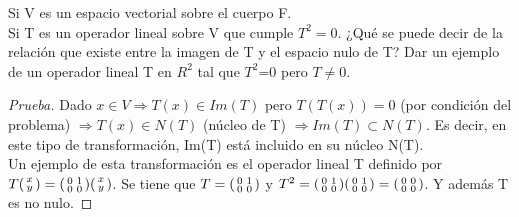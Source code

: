 \documentclass[12pt]{article}
\newenvironment{problem}[2][Problem]{\begin{trivlist}
\item[\hskip \labelsep {\bfseries #1}\hskip \labelsep {\bfseries #2.}]}{\end{trivlist}}
\newenvironment{xmat}
  {\left(\begin{smallmatrix}}
  {\end{smallmatrix}\right)}
\begin{document}
\begin{problem}{2}
\end{problem}
\begin{problem}{2.1}
Si V es un espacio vectorial sobre el cuerpo F. \\
Si T es un operador lineal sobre V que cumple $T^{2}=0$. ¿Qué se puede decir de la relación que existe entre la imagen de T y el espacio nulo de T? Dar un ejemplo de un operador lineal T en $R^{2}$ tal que $T^{2}$=0 pero $T\neq0$.
\end{problem}
 
\begin{proof}[Prueba]
Dado $x \in V \Longrightarrow T(x) \in Im(T)$ pero $T(T(x))= 0$ (por condición del problema) $\Longrightarrow T(x) \in N(T)$ (núcleo de T) $\Longrightarrow Im(T) \subset N(T)$. Es decir, en este tipo de transformación, Im(T) está incluido en su núcleo N(T).\\
Un ejemplo de esta transformación es el operador lineal T definido por $T\begin{xmat}x \\y\end{xmat} = \begin{xmat}0 & 1\\0 & 0\end{xmat}\begin{xmat}x \\y\end{xmat}$. Se tiene que $T=\begin{xmat}0 & 1\\0 & 0\end{xmat}$ y $T^{2}=\begin{xmat}0 & 1\\0 & 0\end{xmat}\begin{xmat}0 & 1\\0 & 0\end{xmat}=\begin{xmat}0 & 0\\0 & 0\end{xmat}$. Y además T es no nulo.
\end{proof}
\end{document}
